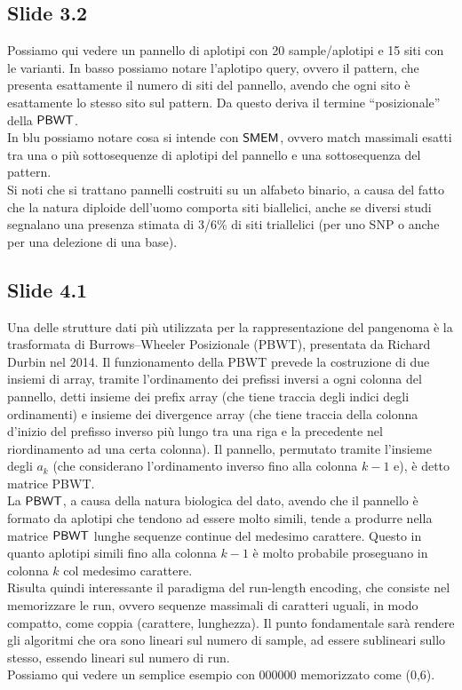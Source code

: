 \documentclass[a4paper,11pt, oneside,italian]{article}
\def\PBWT{\mbox{\rm {\sf PBWT}}}
\def\SMEM{\mbox{\rm {\sf SMEM}}}
\begin{document}
\subsection*{Slide 3.2}
Possiamo qui vedere un pannello di aplotipi con 20 sample/aplotipi e 15 siti con
le varianti. In basso possiamo notare l'aplotipo query, ovvero il pattern, che
presenta esattamente il numero di siti del pannello, avendo che ogni
sito è esattamente lo stesso sito sul pattern. Da questo deriva il termine
``posizionale'' della $\PBWT$.\\
In blu possiamo notare cosa si intende con $\SMEM$, ovvero match massimali
esatti tra una o più sottosequenze di aplotipi del pannello e una sottosequenza
del pattern.\\
Si noti che si trattano pannelli costruiti su un alfabeto binario, a causa del
fatto che la natura diploide dell'uomo comporta siti biallelici, anche se
diversi studi segnalano una presenza stimata di 3/6\% di siti triallelici (per
uno SNP o anche per una delezione di una base).
\subsection*{Slide 4.1}
Una delle strutture dati più utilizzata per la rappresentazione del pangenoma è
la trasformata di Burrows–Wheeler Posizionale (PBWT), presentata da Richard
Durbin nel 2014.
Il funzionamento della PBWT prevede la costruzione di due insiemi di array,
tramite l’ordinamento dei prefissi inversi a ogni colonna del pannello, detti
insieme dei prefix array (che tiene traccia degli indici degli ordinamenti) e
insieme dei divergence array (che tiene traccia della colonna d'inizio del
prefisso inverso più lungo tra una riga e la precedente nel riordinamento ad una
certa colonna). Il pannello, permutato  
tramite l’insieme degli $a_k$ (che considerano l'ordinamento inverso fino
alla colonna $k-1$ e), è detto matrice PBWT.\\
La $\PBWT$, a causa della natura biologica del dato, avendo che il pannello è
formato da aplotipi che tendono ad essere molto simili, tende a produrre nella
matrice $\PBWT$ lunghe sequenze continue del medesimo carattere. Questo in
quanto aplotipi simili fino alla colonna $k-1$ è molto probabile proseguano in
colonna $k$ col medesimo carattere.\\
Risulta quindi interessante il paradigma del run-length encoding, che consiste
nel memorizzare le run, ovvero sequenze massimali di caratteri uguali, in modo
compatto, come coppia (carattere, lunghezza). Il punto fondamentale sarà rendere
gli algoritmi che ora sono lineari sul numero di sample, ad essere
sublineari sullo stesso, essendo lineari sul numero di run.\\
Possiamo qui vedere un semplice esempio con 000000 memorizzato come (0,6).
\end{document}

